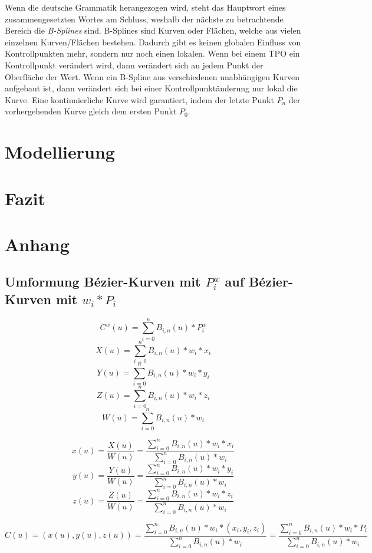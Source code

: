 \documentclass[11pt]{article}
\begin{document}
Wenn die deutsche Grammatik herangezogen wird, steht das Hauptwort eines zusammengesetzten Wortes am Schluss, weshalb der nächste zu betrachtende Bereich die \emph{B-Splines} sind. 
B-Splines sind Kurven oder Flächen, welche aus vielen einzelnen Kurven/Flächen bestehen. 
Dadurch gibt es keinen globalen Einfluss von Kontrollpunkten mehr, sondern nur noch einen lokalen. 
Wenn bei einem TPO ein Kontrollpunkt verändert wird, dann verändert sich an jedem Punkt der Oberfläche der Wert.
Wenn ein B-Spline aus verschiedenen unabhängigen Kurven aufgebaut ist, dann verändert sich bei einer Kontrollpunktänderung nur lokal die Kurve. 
Eine kontinuierliche Kurve wird garantiert, indem der letzte Punkt $P_{n}$ der vorhergehenden Kurve gleich dem ersten Punkt $P_{0}$. 


\section{Modellierung}
\label{sec:modellierung}
\section{Fazit}
\label{sec:fazit}
\section{Anhang}
\subsection{Umformung Bézier-Kurven mit $P_{i}^{w}$ auf Bézier-Kurven mit $w_{i}*P_{i}$}
\[C^{w}(u) = \sum_{i=0}^{n} B_{i,n} (u) * P^{w}_{i}\]
\[X(u) = \sum_{i=0}^{n} B_{i,n} (u) * w_{i} * x_{i}\]
\[Y(u) = \sum_{i=0}^{n} B_{i,n} (u) * w_{i} * y_{i}\]
\[Z(u) = \sum_{i=0}^{n} B_{i,n} (u) * w_{i} * z_{i}\]
\[W(u) = \sum_{i=0}^{n} B_{i,n} (u) * w_{i}\]

\[x(u) = \frac{X(u)}{W(u)} = \frac{\sum_{i=0}^{n} B_{i,n} (u) * w_{i} * x_{i}}{ \sum_{i=0}^{n} B_{i,n} (u) * w_{i}}\] 
\[y(u) = \frac{Y(u)}{W(u)} = \frac{\sum_{i=0}^{n} B_{i,n} (u) * w_{i} * y_{i}}{ \sum_{i=0}^{n} B_{i,n} (u) * w_{i}}\] 
\[z(u) = \frac{Z(u)}{W(u)} = \frac{\sum_{i=0}^{n} B_{i,n} (u) * w_{i} * z_{i}}{ \sum_{i=0}^{n} B_{i,n} (u) * w_{i}}\] 

\[C(u) = (x(u), y(u), z(u)) = \frac{\sum_{i=0}^{n} B_{i,n}(u) * w_{i} * (x_{i}, y_{i}, z_{i})}{\sum_{i=0}^{n} B_{i,n}(u) * w_{i}} =  \frac{\sum_{i=0}^{n} B_{i,n}(u) * w_{i} * P_{i}}{\sum_{i=0}^{n} B_{i,n}(u) * w_{i}}\]
\end{document}
